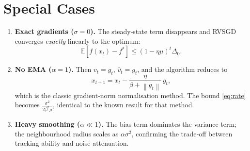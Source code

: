 \documentclass{article}
\newcommand{\E}{\mathbb{E}}
\newcommand{\norm}[1]{\left\lVert#1\right\rVert}
\begin{document}
\section*{Special Cases}
\begin{enumerate}[label=(\alph*)]
\item \textbf{Exact gradients ($\sigma=0$).}
The steady‑state term disappears and RVSGD converges \emph{exactly}
linearly to the optimum:
\[
\E[f(x_{t})-f^{*}]\le (1-\eta\mu)^{t}\Delta_{0}.
\]
\item \textbf{No EMA ($\alpha=1$).}
Then $v_t=g_t$, $\hat v_t=g_t$, and the algorithm reduces to
\[
x_{t+1}=x_t-\frac{\eta}{\beta+\norm{g_t}}\,g_t,
\]
which is the classic gradient‑norm normalisation method.
The bound \eqref{eq:rate} becomes $\frac{\sigma^{2}}{2\beta^{2}\mu}$,
identical to the known result for that method.
\item \textbf{Heavy smoothing ($\alpha\ll1$).}
The bias term dominates the variance term; the neighbourhood radius scales
as $\alpha\sigma^{2}$, confirming the trade‑off between tracking ability
and noise attenuation.
\end{enumerate}
\end{document}
